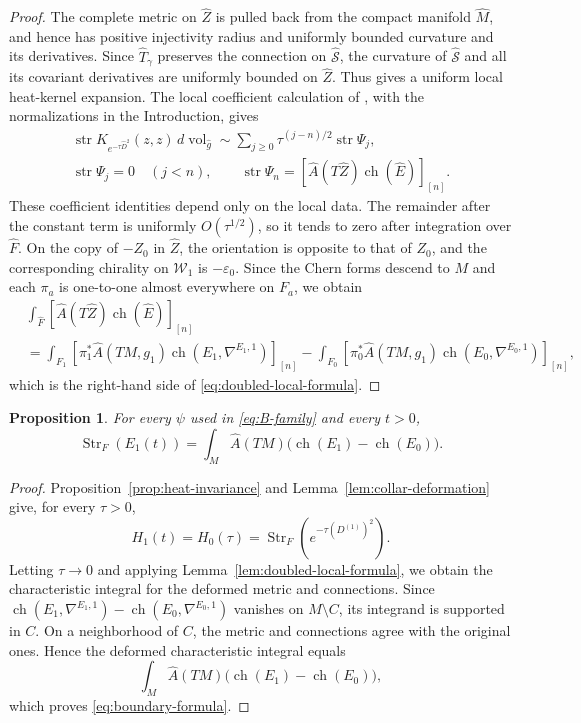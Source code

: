 \documentclass[12pt,reqno]{amsart}
\numberwithin{equation}{section}
\newtheorem{proposition}[theorem]{Proposition}
\theoremstyle{definition}
\newcommand{\Ahat}{\widehat A}
\newcommand{\ch}{\operatorname{ch}}
\newcommand{\Str}{\operatorname{Str}}
\newcommand{\str}{\operatorname{str}}
\newcommand{\cS}{\mathcal S}
\newcommand{\cW}{\mathscr W}
\begin{document}
\begin{proof}
The complete metric on $\widehat Z$ is pulled back from the compact
manifold $\widehat M$, and hence has positive injectivity radius and
uniformly bounded curvature and its derivatives.  Since
$\widehat T_\gamma$ preserves the connection on $\widehat{\cS}$,
the curvature of $\widehat{\cS}$ and all its covariant derivatives
are uniformly bounded on $\widehat Z$.
Thus \cite[Proposition~2.11]{RoeOpenIndex} gives a uniform local
heat-kernel expansion.  The local coefficient calculation of
\cite[Theorems~4.1--4.2 and \S4.3]{BGV}, with the normalizations in
the Introduction, gives
\[
 \begin{gathered}
 \str K_{e^{-\tau\widehat D^2}}(z,z)\,d\operatorname{vol}_{\widehat g}
 \sim\sum_{j\geq0}\tau^{(j-n)/2}\str\Psi_j,\\
 \str\Psi_j=0\quad(j<n),\qquad
 \str\Psi_n=[\Ahat(T\widehat Z)\ch(\widehat E)]_{[n]}.
 \end{gathered}
\]
These coefficient identities depend only on the local data.
The remainder after the constant term is uniformly
$O(\tau^{1/2})$, so it tends to zero after integration over
$\widehat F$.  On the copy of $-Z_0$ in $\widehat Z$, the orientation
is opposite to that of $Z_0$, and the corresponding chirality on
$\cW_1$ is $-\varepsilon_0$.  Since the Chern forms descend to $M$
and each $\pi_a$ is one-to-one almost everywhere on $F_a$, we obtain
\[
 \begin{aligned}
&\int_{\widehat F}[\Ahat(T\widehat Z)\ch(\widehat E)]_{[n]}\\
 &=\int_{F_1}
 [\pi_1^*\Ahat(TM,g_1)\ch(E_1,\nabla^{E_1,1})]_{[n]}
-\int_{F_0}
 [\pi_0^*\Ahat(TM,g_1)\ch(E_0,\nabla^{E_0,1})]_{[n]},
 \end{aligned}
\]
which is the right-hand side of
\eqref{eq:doubled-local-formula}.
\end{proof}

\begin{proposition}\label{prop:boundary-formula}
For every $\psi$ used in \eqref{eq:B-family} and every $t>0$,
\begin{equation}\label{eq:boundary-formula}
 \Str_F(E_1(t))=
 \int_M\Ahat(TM)\bigl(\ch(E_1)-\ch(E_0)\bigr).
\end{equation}
\end{proposition}

\begin{proof}
Proposition~\ref{prop:heat-invariance} and
Lemma~\ref{lem:collar-deformation} give, for every $\tau>0$,
\[
 H_1(t)=H_0(\tau)=\Str_F(e^{-\tau(D^{(1)})^2}).
\]
Letting $\tau\to 0$ and applying
Lemma~\ref{lem:doubled-local-formula}, we obtain the characteristic
integral for the deformed metric and connections.  Since $\ch(E_1,\nabla^{E_1,1})-\ch(E_0,\nabla^{E_0,1})$
vanishes on $M\setminus C$, its integrand is supported in $C$.
On a neighborhood of $C$, the metric and connections agree with the
original ones.  Hence the deformed characteristic integral equals
\[
 \int_M\Ahat(TM)\bigl(\ch(E_1)-\ch(E_0)\bigr),
\]
which proves \eqref{eq:boundary-formula}.
\end{proof}
\end{document}
